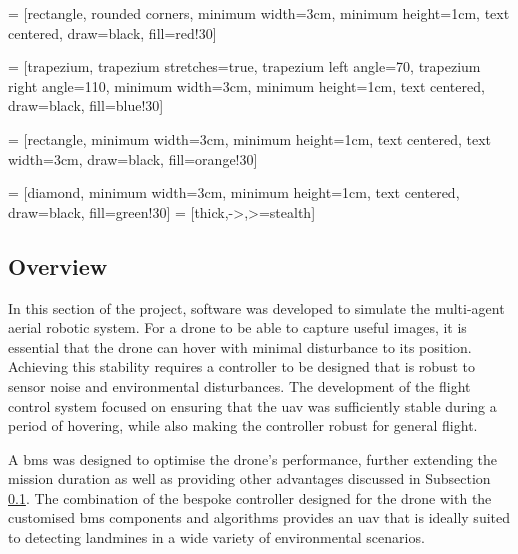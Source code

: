 \usetikzlibrary{shapes.geometric, arrows}

 = [rectangle, rounded corners, 
minimum width=3cm, 
minimum height=1cm,
text centered, 
draw=black, 
fill=red!30]

 = [trapezium, 
trapezium stretches=true, %
trapezium left angle=70, 
trapezium right angle=110, 
minimum width=3cm, 
minimum height=1cm, text centered, 
draw=black, fill=blue!30]

 = [rectangle, 
minimum width=3cm, 
minimum height=1cm, 
text centered, 
text width=3cm, 
draw=black, 
fill=orange!30]

 = [diamond, 
minimum width=3cm, 
minimum height=1cm, 
text centered, 
draw=black, 
fill=green!30]
 = [thick,->,>=stealth]



\subsection{Overview}

In this section of the project, software was developed to simulate the multi-agent aerial robotic system. For a drone to be able to capture useful images, it is essential that the drone can hover with minimal disturbance to its position. Achieving this stability requires a controller to be designed that is robust to sensor noise and environmental disturbances. The development of the flight control system focused on ensuring that the \gls{uav} was sufficiently stable during a period of hovering, while also making the controller robust for general flight.

A \gls{bms} was designed to optimise the drone's performance, further extending the mission duration as well as providing other advantages discussed in Subsection \ref{}. The combination of the bespoke controller designed for the drone with the customised \gls{bms} components and algorithms provides an \gls{uav} that is ideally suited to detecting landmines in a wide variety of environmental scenarios.

